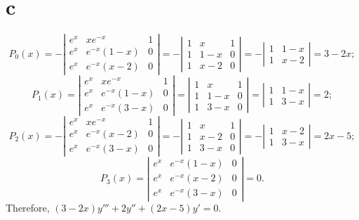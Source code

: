 \documentclass[dvips]{book}
\numberwithin{example}{section}
\numberwithin{equation}{section}
\numberwithin{theorem}{section}
\numberwithin{table}{section}
\numberwithin{figure}{section}
\begin{document}
\part{c}
$$
P_0(x)=
-\left|\begin{array}
{ccc}e^x&xe^{-x}&1\\
e^x&e^{-x}(1-x)&0\\
e^x&e^{-x}(x-2)&0
\end{array}\right|=
-\left|\begin{array}{ccc}
1&x&1\\1&1-x&0\\1&x-2&0
\end{array}\right|=
-\left|\begin{array}{ccc}
1&1-x\\1&x-2
\end{array}\right|=3-2x;
$$
$$
P_1(x)=
\left|\begin{array}{ccc}
e^x&xe^{-x}&1\\
e^x&e^{-x}(1-x)&0\\
e^x&e^{-x}(3-x)&0
\end{array}\right|=
\left|\begin{array}{ccc}
1&x&1\\
1&1-x&0\\
1&3-x&0
\end{array}\right|=
\left|\begin{array}{ccc}
1&1-x\\
1&3-x
\end{array}\right|=2;
$$
$$
P_2(x)=
-\left|\begin{array}{ccc}
e^x&xe^{-x}&1\\
e^x&e^{-x}(x-2)&0\\
e^x&e^{-x}(3-x)&0
\end{array}\right|=
-\left|\begin{array}{ccc}
1&x&1\\
1&x-2&0\\
1&3-x&0
\end{array}\right|=
-\left|\begin{array}{ccc}
1&x-2\\
1&3-x
\end{array}\right|=2x-5;
$$
$$
P_3(x)=
\left|\begin{array}{ccc}
e^x&e^{-x}(1-x)&0\\
e^x&e^{-x}(x-2)&0\\
e^x&e^{-x}(3-x)&0
\end{array}\right|=0.
$$
Therefore,
$(3-2x)y'''+2y''+(2x-5)y'=0$.
\end{document}
